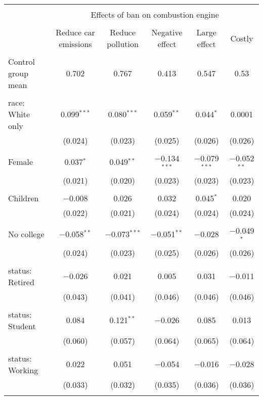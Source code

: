 
\begin{tabular}{@{\extracolsep{5pt}}lccccc} 
\\[-1.8ex]\hline 
\hline \\[-1.8ex] 
 & \multicolumn{5}{c}{Effects of ban on combustion engine} \\ 
\cline{2-6} 
\\[-1.8ex] & Reduce car emissions & Reduce pollution & Negative effect & Large effect & Costly \\ 
\hline \\[-1.8ex] 
 Control group mean & 0.702 & 0.767 & 0.413 & 0.547 & 0.53  \\ \hline \\[-1.8ex] race: White only & 0.099$^{***}$ & 0.080$^{***}$ & 0.059$^{**}$ & 0.044$^{*}$ & 0.0001 \\ 
  & (0.024) & (0.023) & (0.025) & (0.026) & (0.026) \\ 
  & & & & & \\ 
 Female & 0.037$^{*}$ & 0.049$^{**}$ & $-$0.134$^{***}$ & $-$0.079$^{***}$ & $-$0.052$^{**}$ \\ 
  & (0.021) & (0.020) & (0.023) & (0.023) & (0.023) \\ 
  & & & & & \\ 
 Children & $-$0.008 & 0.026 & 0.032 & 0.045$^{*}$ & 0.020 \\ 
  & (0.022) & (0.021) & (0.024) & (0.024) & (0.024) \\ 
  & & & & & \\ 
 No college & $-$0.058$^{**}$ & $-$0.073$^{***}$ & $-$0.051$^{**}$ & $-$0.028 & $-$0.049$^{*}$ \\ 
  & (0.024) & (0.023) & (0.025) & (0.026) & (0.026) \\ 
  & & & & & \\ 
 status: Retired & $-$0.026 & 0.021 & 0.005 & 0.031 & $-$0.011 \\ 
  & (0.043) & (0.041) & (0.046) & (0.046) & (0.046) \\ 
  & & & & & \\ 
 status: Student & 0.084 & 0.121$^{**}$ & $-$0.026 & 0.085 & 0.013 \\ 
  & (0.060) & (0.057) & (0.064) & (0.065) & (0.064) \\ 
  & & & & & \\ 
 status: Working & 0.022 & 0.051 & $-$0.054 & $-$0.016 & $-$0.028 \\ 
  & (0.033) & (0.032) & (0.035) & (0.036) & (0.036) \\ 
  & & & & & \\ 

\end{tabular}
